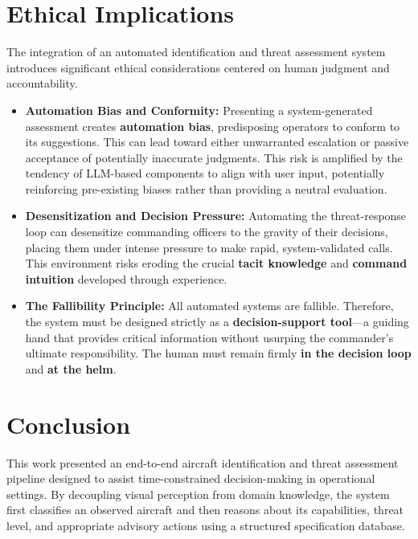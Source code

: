 \documentclass[11pt]{article}
\begin{document}
\section*{Ethical Implications}
The integration of an automated identification and threat assessment system introduces significant ethical considerations centered on human judgment and accountability.

\begin{itemize}
    \item \textbf{Automation Bias and Conformity:} Presenting a system-generated assessment creates \textbf{automation bias}, predisposing operators to conform to its suggestions. This can lead toward either unwarranted escalation or passive acceptance of potentially inaccurate judgments. This risk is amplified by the tendency of LLM-based components to align with user input, potentially reinforcing pre-existing biases rather than providing a neutral evaluation.

    \item \textbf{Desensitization and Decision Pressure:} Automating the threat-response loop can desensitize commanding officers to the gravity of their decisions, placing them under intense pressure to make rapid, system-validated calls. This environment risks eroding the crucial \textbf{tacit knowledge} and \textbf{command intuition} developed through experience.

    \item \textbf{The Fallibility Principle:} All automated systems are fallible. Therefore, the system must be designed strictly as a \textbf{decision-support tool}—a guiding hand that provides critical information without usurping the commander's ultimate responsibility. The human must remain firmly \textbf{in the decision loop} and \textbf{at the helm}.
\end{itemize}

\section*{Conclusion}

This work presented an end-to-end aircraft identification and threat assessment pipeline designed to assist time-constrained decision-making in operational settings. By decoupling visual perception from domain knowledge, the system first classifies an observed aircraft and then reasons about its capabilities, threat level, and appropriate advisory actions using a structured specification database.
\end{document}
